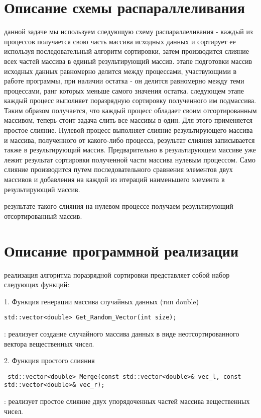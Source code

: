 \documentclass[12pt]{report}
\begin{document}
\newpage


\section*{Описание схемы распараллеливания}
 данной задаче мы используем следующую схему распараллеливания - каждый из процессов получается свою часть массива исходных данных и сортирует ее используя последовательный алгоритм сортировки, затем производится слияние всех частей массива в единый результирующий массив.
 этапе подготовки массив исходных данных равномерно делится между процессами, участвующими в работе программы, при наличии остатка - он делится равномерно между теми процессами, ранг которых меньше самого значения остатка.
 следующем этапе каждый процесс выполняет поразрядную сортировку полученного им подмассива. Таким образом получается, что каждый процесс обладает своим отсортированным массивом, теперь стоит задача слить все массивы в один. Для этого применяется простое слияние. Нулевой процесс выполняет слияние результирующего массива и массива, полученного от какого-либо процесса, результат слияния записывается также в результирующий массив. Предварительно в результирующем массиве уже лежит результат сортировки полученной части массива нулевым процессом. Само слияние производится путем последовательного сравнения элементов двух массивов и добавления на каждой из итераций наименьшего элемента в результирующий массив.


 результате такого слияния на нулевом процессе получаем результирующий отсортированный массив.

\newpage


\section*{Описание программной реализации}
 реализация алгоритма поразрядной сортировки представляет собой набор следующих функций:
\par 1. Функция генерации массива случайных данных (тип double)
\begin{lstlisting}
std::vector<double> Get_Random_Vector(int size);
\end{lstlisting}
: реализует создание случайного массива данных в виде неотсортированного вектора вещественных чисел.

\par 2. Функция простого слияния
\begin{lstlisting}
 std::vector<double> Merge(const std::vector<double>& vec_l, const std::vector<double>& vec_r);
\end{lstlisting}
: реализует простое слияние двух упорядоченных частей массива вещественных чисел.
\end{document}
